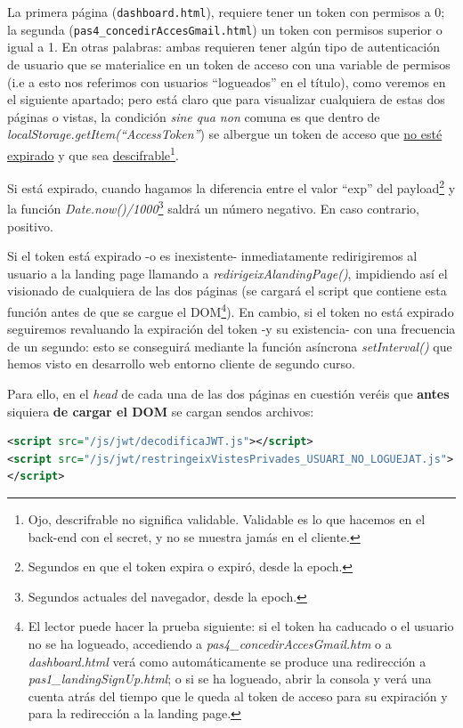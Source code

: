 \documentclass[a4paper,12pt]{report}
\begin{document}
	La primera página (\texttt{dashboard.html}), requiere tener un token con permisos a 0; la segunda (\texttt{pas4\_concedirAccesGmail.html}) un token con permisos superior o igual a 1. En otras palabras: ambas requieren tener algún tipo de autenticación de usuario que se materialice en un token de acceso con una variable de permisos (i.e a esto nos referimos con usuarios ``logueados'' en el título), como veremos en el siguiente apartado; pero está claro que para visualizar cualquiera de estas dos páginas o vistas, la condición \textit{sine qua non} comuna es que dentro de \textit{localStorage.getItem(``AccessToken''}) se albergue un token de acceso que \underline{no esté expirado} y que sea \underline{descifrable}\footnote{Ojo, descrifrable no significa validable. Validable es lo que hacemos en el back-end con el secret, y no se muestra jamás en el cliente.}.
	
	Si está expirado, cuando hagamos la diferencia entre el valor ``exp'' del payload\footnote{Segundos en que el token expira o expiró, desde la epoch.} y la función \textit{Date.now()/1000}\footnote{Segundos actuales del navegador, desde la epoch.} saldrá un número negativo. En caso contrario, positivo. 
	
	Si el token está expirado -o es inexistente- inmediatamente redirigiremos al usuario a la landing page llamando a \textit{redirigeixAlandingPage()}, impidiendo así el visionado de cualquiera de las dos páginas (se cargará el script que contiene esta función antes de que se cargue el DOM\footnote{El lector puede hacer la prueba siguiente: si el token ha caducado o el usuario no se ha logueado, accediendo a \textit{pas4\_concedirAccesGmail.htm} o a \textit{dashboard.html} verá como automáticamente se produce una redirección a \textit{pas1\_landingSignUp.html}; o si se ha logueado, abrir la consola y verá una cuenta atrás del tiempo que le queda al token de acceso para su expiración y para la redirección a la landing page.}). En cambio, si el token no está expirado seguiremos revaluando la expiración del token -y su existencia- con una frecuencia de un segundo: esto se conseguirá mediante la función asíncrona \textit{setInterval()} que hemos visto en desarrollo web entorno cliente de segundo curso.
	
	Para ello, en el \textit{head} de cada una de las dos páginas en cuestión veréis que \textbf{antes} siquiera \textbf{de cargar el DOM} se cargan sendos archivos:
	
\begin{lstlisting}[language=xml, basicstyle=\ttfamily\footnotesize, keywordstyle=\color{magenta}]
<script src="/js/jwt/decodificaJWT.js"></script>
<script src="/js/jwt/restringeixVistesPrivades_USUARI_NO_LOGUEJAT.js">
</script>
\end{lstlisting}
	
\end{document}
